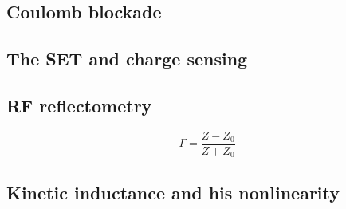 \documentclass[../main.tex]{subfiles}
\begin{document}
\subsection{Coulomb blockade}

\subsection{The SET and charge sensing}

\subsection{RF reflectometry}
\begin{equation}
\label{eq:ReflecCoeff}
    \Gamma = \frac{Z - Z_{0}}{Z + Z_{0}}
\end{equation}

\subsection{Kinetic inductance and his nonlinearity}
\end{document}
